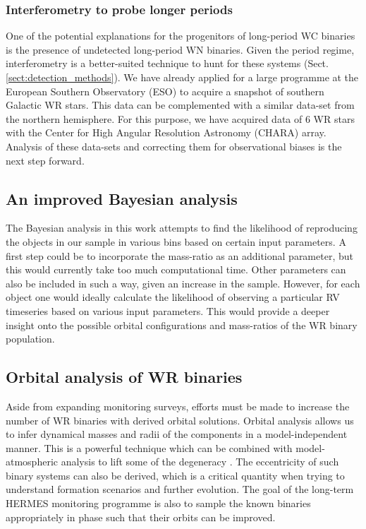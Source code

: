 \subsubsection{Interferometry to probe longer periods}

One of the potential explanations for the progenitors of long-period WC binaries is the presence of undetected long-period WN binaries. Given the period regime, interferometry is a better-suited technique to hunt for these systems (Sect. \ref{sect:detection_methods}). We have already applied for a large programme at the European Southern Observatory (ESO) to acquire a snapshot of southern Galactic WR stars. This data can be complemented with a similar data-set from the northern hemisphere. For this purpose, we have acquired data of 6 WR stars with the Center for High Angular Resolution Astronomy (CHARA) array. Analysis of these data-sets and correcting them for observational biases is the next step forward.

\subsection{An improved Bayesian analysis}

The Bayesian analysis in this work attempts to find the likelihood of reproducing the objects in our sample in various \DelRV{} bins based on certain input parameters. A first step could be to incorporate the mass-ratio as an additional parameter, but this would currently take too much computational time. Other parameters can also be included in such a way, given an increase in the sample. However, for each object one would ideally calculate the likelihood of observing a particular RV timeseries based on various input parameters. This would provide a deeper insight onto the possible orbital configurations and mass-ratios of the WR binary population.

\subsection{Orbital analysis of WR binaries}

Aside from expanding monitoring surveys, efforts must be made to increase the number of WR binaries with derived orbital solutions. Orbital analysis allows us to infer dynamical masses and radii of the components in a model-independent manner. This is a powerful technique which can be combined with model-atmospheric analysis to lift some of the degeneracy \citep[e.g. in][]{richardson_chara_2016,2021Richardson}. The eccentricity of such binary systems can also be derived, which is a critical quantity when trying to understand formation scenarios and further evolution. The goal of the long-term HERMES monitoring programme is also to sample the known binaries appropriately in phase such that their orbits can be improved.

